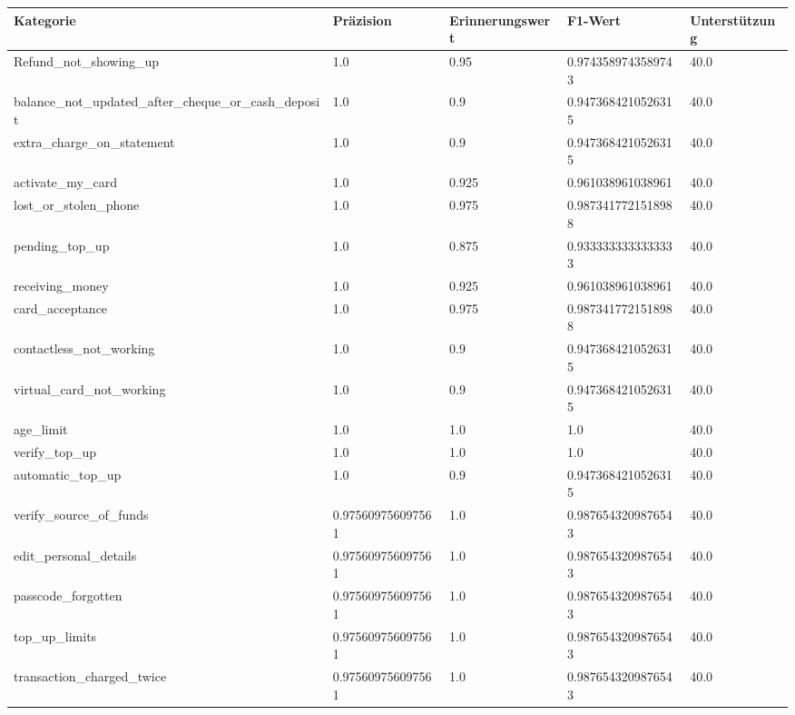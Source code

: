 
    \begin{table}[!ht]
        \centering
        \begin{tabularx}{\textwidth}{X l l l l}
\toprule
\textbf{Kategorie} & \textbf{Präzision} & \textbf{Erinnerungswert} & \textbf{F1-Wert} & \textbf{Unterstützung} \\
\midrule
Refund\_not\_showing\_up & \num{1.0} & \num{0.95} & \num{0.9743589743589743} & \num{40.0} \\
balance\_not\_updated\_after\_cheque\_or\_cash\_deposit & \num{1.0} & \num{0.9} & \num{0.9473684210526315} & \num{40.0} \\
extra\_charge\_on\_statement & \num{1.0} & \num{0.9} & \num{0.9473684210526315} & \num{40.0} \\
activate\_my\_card & \num{1.0} & \num{0.925} & \num{0.961038961038961} & \num{40.0} \\
lost\_or\_stolen\_phone & \num{1.0} & \num{0.975} & \num{0.9873417721518988} & \num{40.0} \\
pending\_top\_up & \num{1.0} & \num{0.875} & \num{0.9333333333333333} & \num{40.0} \\
receiving\_money & \num{1.0} & \num{0.925} & \num{0.961038961038961} & \num{40.0} \\
card\_acceptance & \num{1.0} & \num{0.975} & \num{0.9873417721518988} & \num{40.0} \\
contactless\_not\_working & \num{1.0} & \num{0.9} & \num{0.9473684210526315} & \num{40.0} \\
virtual\_card\_not\_working & \num{1.0} & \num{0.9} & \num{0.9473684210526315} & \num{40.0} \\
age\_limit & \num{1.0} & \num{1.0} & \num{1.0} & \num{40.0} \\
verify\_top\_up & \num{1.0} & \num{1.0} & \num{1.0} & \num{40.0} \\
automatic\_top\_up & \num{1.0} & \num{0.9} & \num{0.9473684210526315} & \num{40.0} \\
verify\_source\_of\_funds & \num{0.975609756097561} & \num{1.0} & \num{0.9876543209876543} & \num{40.0} \\
edit\_personal\_details & \num{0.975609756097561} & \num{1.0} & \num{0.9876543209876543} & \num{40.0} \\
passcode\_forgotten & \num{0.975609756097561} & \num{1.0} & \num{0.9876543209876543} & \num{40.0} \\
top\_up\_limits & \num{0.975609756097561} & \num{1.0} & \num{0.9876543209876543} & \num{40.0} \\
transaction\_charged\_twice & \num{0.975609756097561} & \num{1.0} & \num{0.9876543209876543} & \num{40.0} \\

\end{tabularx}
\end{table}
